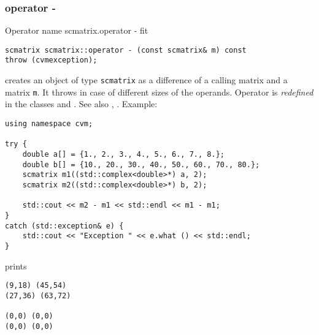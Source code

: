 \subsubsection{operator -}
Operator%
\pdfdest name {scmatrix.operator -} fit
\begin{verbatim}
scmatrix scmatrix::operator - (const scmatrix& m) const
throw (cvmexception);
\end{verbatim}
creates an object of type \verb"scmatrix" as a difference of
a calling matrix and a matrix \verb"m".
It throws  
in case of different sizes of the operands.
Operator is \emph{redefined} in the classes
and .
See also , .
Example:
\begin{Verbatim}
using namespace cvm;

try {
    double a[] = {1., 2., 3., 4., 5., 6., 7., 8.};
    double b[] = {10., 20., 30., 40., 50., 60., 70., 80.};
    scmatrix m1((std::complex<double>*) a, 2);
    scmatrix m2((std::complex<double>*) b, 2);

    std::cout << m2 - m1 << std::endl << m1 - m1;
}
catch (std::exception& e) {
    std::cout << "Exception " << e.what () << std::endl;
}
\end{Verbatim}
prints
\begin{Verbatim}
(9,18) (45,54)
(27,36) (63,72)

(0,0) (0,0)
(0,0) (0,0)
\end{Verbatim}
\newpage






